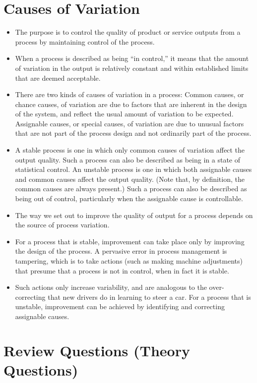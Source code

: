 \documentclass[]{report}
\begin{document}
\section{Causes of Variation}
\begin{itemize}
\item The purpose is to control the quality of product or service outputs from a process by
maintaining control of the process.
\item When a process is described as being “in control,” it means that the amount of
variation in the output is relatively constant and within established limits that are
deemed acceptable.
\item There are two kinds of causes of variation in a process:
Common causes, or chance causes, of variation are due to factors that are
inherent in the design of the system, and reflect the usual amount of variation
to be expected.
Assignable causes, or special causes, of variation are due to unusual
factors that are not part of the process design and not ordinarily part of the
process.
\item A stable process is one in which only common causes of variation affect the output
quality. Such a process can also be described as being in a state of statistical
control.
An unstable process is one in which both assignable causes and common causes
affect the output quality. (Note that, by definition, the common causes are always
present.)
Such a process can also be described as being out of control, particularly when the
assignable cause is controllable.
\item The way we set out to improve the quality of output for a process depends on the
source of process variation.
\item For a process that is stable, improvement can take place only by improving the
design of the process. A pervasive error in process management is tampering,
which is to take actions (such as making machine adjustments) that presume that a
process is not in control, when in fact it is stable.
\item Such actions only increase variability, and are analogous to the over-correcting that
new drivers do in learning to steer a car. For a process that is unstable, improvement
can be achieved by identifying and correcting assignable causes.	
\end{itemize}

\section{Review Questions (Theory Questions)}
\end{document}
